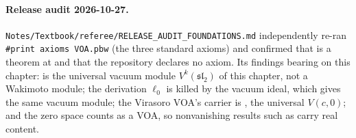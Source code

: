 \paragraph{Release audit 2026-10-27.} \texttt{Notes/\allowbreak Textbook/\allowbreak referee/\allowbreak RELEASE\_AUDIT\_FOUNDATIONS.md}
independently re-ran \texttt{\#print axioms VOA.pbw} (the three standard axioms) and confirmed that
 is a theorem at  and that the repository declares no
axiom. Its findings bearing on this chapter:  is the universal vacuum module $V^k(\mathfrak{sl}_2)$
of this chapter, not a Wakimoto module; the derivation $\ell_0$ is killed by the vacuum ideal, which gives the same vacuum
module; the Virasoro VOA's carrier is , the universal $V(c,0)$; and the zero space counts as a VOA, so
nonvanishing results such as  carry real content.

